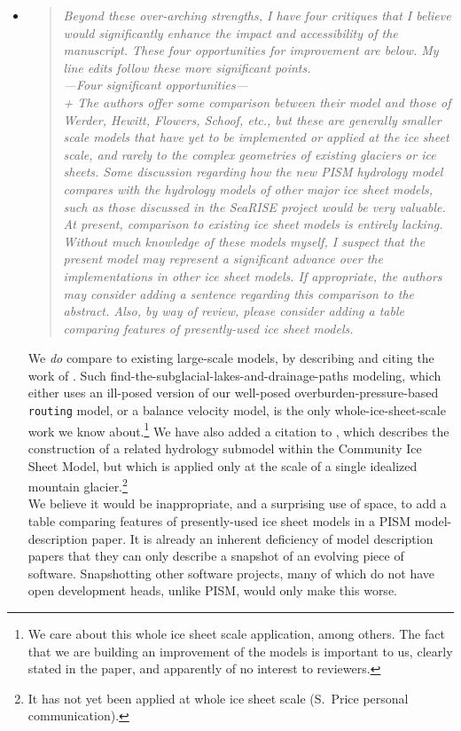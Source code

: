 \documentclass[11pt,reqno]{amsart}
\newcommand{\reply}[2]{
\medskip\medskip
\item  \begin{quote}
\emph{#1}
\end{quote}

\medskip
\noindent #2}
\begin{document}
\begin{itemize}
\reply{Beyond these over-arching strengths, I have four critiques that I believe would significantly enhance the impact and accessibility of the manuscript. These four opportunities for improvement are below. My line edits follow these more significant points.\\
---Four significant opportunities---\\
+ The authors offer some comparison between
their model and those of Werder, Hewitt, Flowers, Schoof, etc., but these are generally smaller scale models that have yet to be implemented or applied at the ice sheet
scale, and rarely to the complex geometries of existing glaciers or ice sheets. Some
discussion regarding how the new PISM hydrology model compares with the hydrology models of other major ice sheet models, such as those discussed in the SeaRISE
project would be very valuable.  At present, comparison to existing ice sheet models is
entirely lacking.  Without much knowledge of these models myself, I suspect that the
present model may represent a significant advance over the implementations in other
ice sheet models.  If appropriate, the authors may consider adding a sentence regarding this comparison to the abstract.  Also, by way of review, please consider adding a
table comparing features of presently-used ice sheet models.}
{We \emph{do} compare to existing large-scale models, by describing and citing the work of \cite{Goeller2014,LeBrocqetal2009,Livingstoneetal2013,Siegertetal2009}.  Such find-the-subglacial-lakes-and-drainage-paths modeling, which either uses an ill-posed version of our well-posed overburden-pressure-based \texttt{routing} model, or a balance velocity model, is the only whole-ice-sheet-scale work we know about.\footnote{We care about this whole ice sheet scale application, among others.  The fact that we are building an improvement of the \cite{Goeller2014,LeBrocqetal2009,Livingstoneetal2013,Siegertetal2009} models is important to us, clearly stated in the paper, and apparently of no interest to reviewers.}  We have also added a citation to \cite{HoffmanPrice2014}, which describes the construction of a related hydrology submodel within the Community Ice Sheet Model, but which is applied only at the scale of a single idealized mountain glacier.\footnote{It has not yet been applied at whole ice sheet scale (S.~Price personal communication).}\\
\indent We believe it would be inappropriate, and a surprising use of space, to add a table comparing features of presently-used ice sheet models in a PISM model-description paper.  It is already an inherent deficiency of model description papers that they can only describe a snapshot of an evolving piece of software.  Snapshotting other software projects, many of which do not have open development heads, unlike PISM, would only make this worse.}


\end{itemize}
\end{document}
